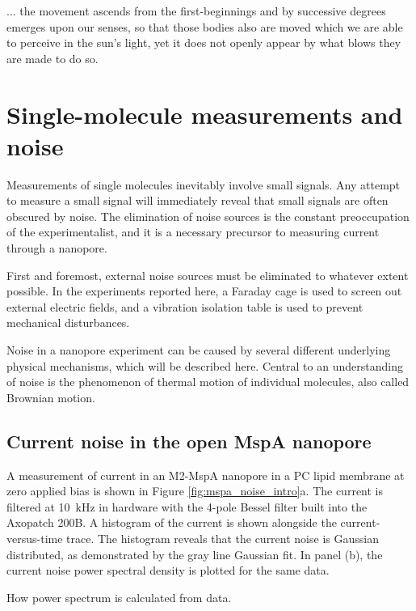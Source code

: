 \begin{savequote}[75mm]
... the movement ascends from the first-beginnings and by successive degrees emerges upon our senses, so that those bodies also are moved which we are able to perceive in the sun's light, yet it does not openly appear by what blows they are made to do so.
\end{savequote}

\chapter{Single-molecule measurements and noise}
\label{thermal_motion}

Measurements of single molecules inevitably involve small signals.  Any attempt to measure a small signal will immediately reveal that small signals are often obscured by noise.  The elimination of noise sources is the constant preoccupation of the experimentalist, and it is a necessary precursor to measuring current through a nanopore.

First and foremost, external noise sources must be eliminated to whatever extent possible.  In the experiments reported here, a Faraday cage is used to screen out external electric fields, and a vibration isolation table is used to prevent mechanical disturbances.

Noise in a nanopore experiment can be caused by several different underlying physical mechanisms, which will be described here.  Central to an understanding of noise is the phenomenon of thermal motion of individual molecules, also called Brownian motion.

\section{Current noise in the open MspA nanopore}

A measurement of current in an M2-MspA nanopore in a PC lipid membrane at zero applied bias is shown in Figure \ref{fig:mspa_noise_intro}a.  The current is filtered at \SI{10}{\kHz} in hardware with the 4-pole Bessel filter built into the Axopatch 200B.  A histogram of the current is shown alongside the current-versus-time trace.  The histogram reveals that the current noise is Gaussian distributed, as demonstrated by the gray line Gaussian fit.  In panel (b), the current noise power spectral density is plotted for the same data.

How power spectrum is calculated from data.

